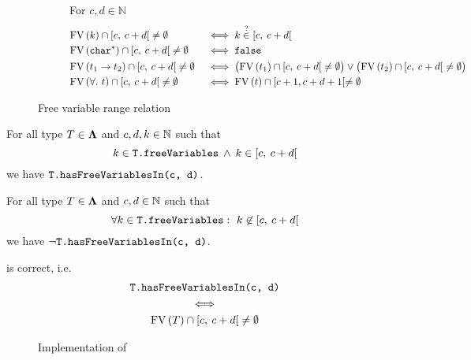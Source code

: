 \begin{figure*}
    \begin{subfigure}{\linewidth}
    For $c, d \in \mathbb{N}$
    \begin{alignat*}{2}
        &\textup{FV}\left(k\right) \cap {\left[c,\:c+d\right[} \neq \emptyset && \iff k \overset{?}{\in} {\left[c,\:c+d\right[} \\
        &\textup{FV}\left(\texttt{char}^{*}\right) \cap {\left[c,\:c+d\right[} \neq \emptyset && \iff \texttt{false} \\
        &\textup{FV}\left({t_1} \rightarrow{}{} {t_2}\right) \cap {\left[c,\:c+d\right[} \neq \emptyset && \iff 
        \big( \textup{FV}\left(t_1\right) \cap {\left[c,\:c+d\right[} \neq \emptyset \big) \lor
        \big( \textup{FV}\left(t_2\right) \cap {{\left[c,\:c+d\right[}} \neq \emptyset \big) \\
        &\textup{FV}\left(\forall{}.\ {t}\right) \cap {\left[c,\:c+d\right[} \neq \emptyset &&\iff \textup{FV}\left(t\right) \cap [c + 1, c + d + 1[ \neq \emptyset
    \end{alignat*}
    \end{subfigure}
    \caption{Free variable range relation}
    \label{fig:freevar_rel}
\end{figure*}



\begin{lemma}\label{thm:freevarsin_compl}
    For all type $T \in \bm\Lambda$ and $c,d,k \in \mathbb{N}$ 
    such that 
    \[k \in \inlcode{T.freeVariables} \mand k \in \srangelo{c}{c+d}\]
    we have
    $\texttt{T.hasFreeVariablesIn(c, d)}$.
\end{lemma}

\begin{lemma}\label{thm:freevarsin_sound}
    For all type $T \in \bm\Lambda$ and $c,d \in \mathbb{N}$ 
    such that 
    \[\forall k \in \texttt{T.freeVariables}:\ k \not\in {\left[c,\:c+d\right[}\]
    we have 
    $\neg\texttt{T.hasFreeVariablesIn(c, d)}$.
\end{lemma}

\begin{ucorollary}
     is correct, i.e.
    \begin{gather*}
        \texttt{T.hasFreeVariablesIn(c, d)} \\
        \iff \\
        \textup{FV}\left(T\right) \cap {\left[c,\:c+d\right[} \neq \emptyset
    \end{gather*}
\end{ucorollary}

\begin{figure}[H]
    \centering
    
    \caption{Implementation of }
    \label{fig:def_hasFreeVariablesIn}
\end{figure}

